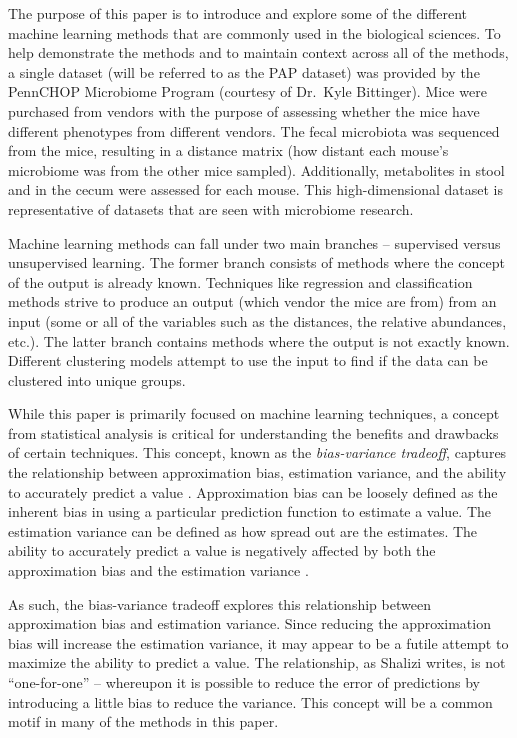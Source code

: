 \documentclass[12pt,openany]{book}
\begin{document}
The purpose of this paper is to introduce and explore some of the
different machine learning methods that are commonly used in the
biological sciences. To help demonstrate the methods and to maintain
context across all of the methods, a single dataset (will be referred to
as the PAP dataset) was provided by the PennCHOP Microbiome Program
(courtesy of Dr.~Kyle Bittinger). Mice were purchased from vendors with
the purpose of assessing whether the mice have different phenotypes from
different vendors. The fecal microbiota was sequenced from the mice,
resulting in a distance matrix (how distant each mouse's microbiome was
from the other mice sampled). Additionally, metabolites in stool and in
the cecum were assessed for each mouse. This high-dimensional dataset is
representative of datasets that are seen with microbiome research.

Machine learning methods can fall under two main branches -- supervised
versus unsupervised learning. The former branch consists of methods
where the concept of the output is already known. Techniques like
regression and classification methods strive to produce an output (which
vendor the mice are from) from an input (some or all of the variables
such as the distances, the relative abundances, etc.). The latter branch
contains methods where the output is not exactly known. Different
clustering models attempt to use the input to find if the data can be
clustered into unique groups.

While this paper is primarily focused on machine learning techniques, a
concept from statistical analysis is critical for understanding the
benefits and drawbacks of certain techniques. This concept, known as the
\emph{bias-variance tradeoff}, captures the relationship between
approximation bias, estimation variance, and the ability to accurately
predict a value \citep{shalizi}. Approximation bias can be loosely
defined as the inherent bias in using a particular prediction function
to estimate a value. The estimation variance can be defined as how
spread out are the estimates. The ability to accurately predict a value
is negatively affected by both the approximation bias and the estimation
variance \citep{shalizi}.

As such, the bias-variance tradeoff explores this relationship between
approximation bias and estimation variance. Since reducing the
approximation bias will increase the estimation variance, it may appear
to be a futile attempt to maximize the ability to predict a value. The
relationship, as Shalizi writes, is not ``one-for-one'' \citep{shalizi}
-- whereupon it is possible to reduce the error of predictions by
introducing a little bias to reduce the variance. This concept will be a
common motif in many of the methods in this paper.
\end{document}
